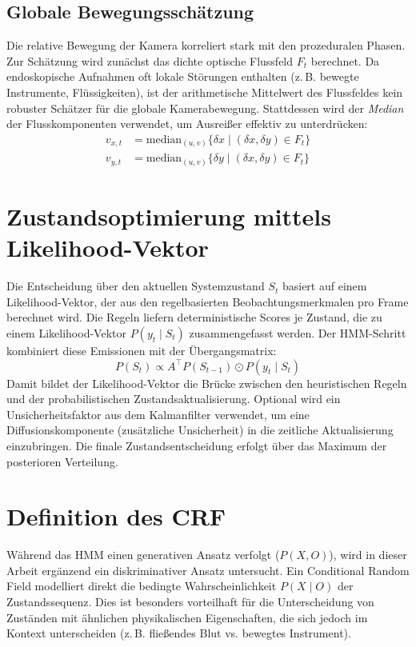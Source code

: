 \subsection{Globale Bewegungsschätzung}

Die relative Bewegung der Kamera korreliert stark mit den prozeduralen Phasen. Zur Schätzung wird zunächst das dichte optische Flussfeld $F_t$ berechnet.
Da endoskopische Aufnahmen oft lokale Störungen enthalten (z.\,B. bewegte Instrumente, Flüssigkeiten), ist der arithmetische Mittelwert des Flussfeldes kein robuster Schätzer für die globale Kamerabewegung. Stattdessen wird der \emph{Median} der Flusskomponenten verwendet, um Ausreißer effektiv zu unterdrücken:
\begin{align}
    v_{x,t} &= \text{median}_{(u,v)} \{ \delta x \mid (\delta x, \delta y) \in F_t \} \\
    v_{y,t} &= \text{median}_{(u,v)} \{ \delta y \mid (\delta x, \delta y) \in F_t \}
\end{align}

\section{Zustandsoptimierung mittels Likelihood-Vektor}

Die Entscheidung über den aktuellen Systemzustand $S_t$ basiert auf einem Likelihood-Vektor, der aus den regelbasierten Beobachtungsmerkmalen pro Frame berechnet wird. Die Regeln liefern deterministische Scores je Zustand, die zu einem Likelihood-Vektor $P(y_t \mid S_t)$ zusammengefasst werden. Der HMM-Schritt kombiniert diese Emissionen mit der Übergangsmatrix:
\begin{equation}
P(S_t) \propto A^\top P(S_{t-1}) \odot P(y_t \mid S_t)
\end{equation}
Damit bildet der Likelihood-Vektor die Brücke zwischen den heuristischen Regeln und der probabilistischen Zustandsaktualisierung.
Optional wird ein Unsicherheitsfaktor aus dem Kalmanfilter verwendet, um eine Diffusionskomponente (zusätzliche Unsicherheit) in die zeitliche Aktualisierung einzubringen. Die finale Zustandsentscheidung erfolgt über das Maximum der posterioren Verteilung.

\section{Definition des CRF} \label{sec:crf_definition}

Während das HMM einen generativen Ansatz verfolgt ($P(X, O)$), wird in dieser Arbeit ergänzend ein diskriminativer Ansatz untersucht. Ein Conditional Random Field  modelliert direkt die bedingte Wahrscheinlichkeit $P(X \mid O)$ der Zustandssequenz. Dies ist besonders vorteilhaft für die Unterscheidung von Zuständen mit ähnlichen physikalischen Eigenschaften, die sich jedoch im Kontext unterscheiden (z.\,B. fließendes Blut vs. bewegtes Instrument).

